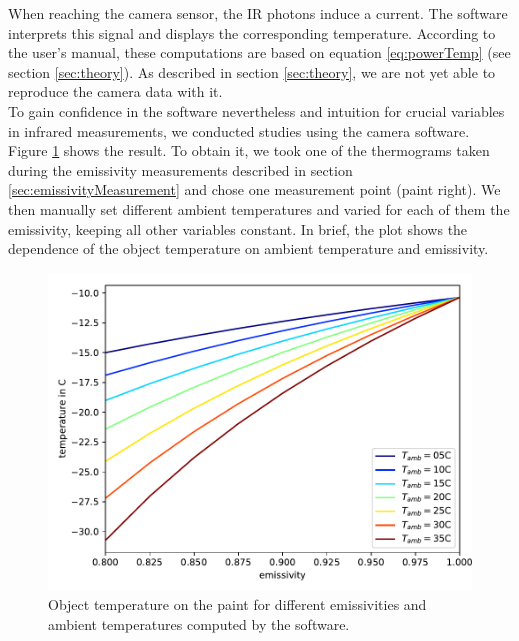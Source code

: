 When reaching the camera sensor, the IR photons induce a current. The software interprets this signal and displays the corresponding temperature. According to the user's manual, these computations are based on equation \eqref{eq:powerTemp} (see section \ref{sec:theory}). As described in section \ref{sec:theory}, we are not yet able to reproduce the camera data with it. \\


To gain confidence in the software nevertheless and intuition for crucial variables in infrared measurements, we conducted studies using the camera software. Figure \ref{fig:softwareClean} shows the result. To obtain it, we took one of the thermograms taken during the emissivity measurements described in section \ref{sec:emissivityMeasurement} and chose one measurement point (paint right). We then manually set different ambient temperatures and varied for each of them the emissivity, keeping all other variables constant. In brief, the plot shows the dependence of the object temperature on ambient temperature and emissivity.
\begin{figure}[h!]
	\centering
	\includegraphics[width=.8\textwidth]{img/softwareClean.pdf}
	\caption{Object temperature on the paint for different emissivities and ambient temperatures computed by the software.}
	\label{fig:softwareClean}
\end{figure} \\

